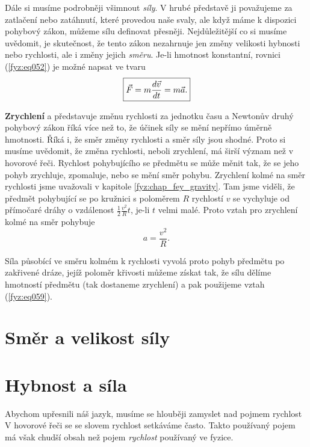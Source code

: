     Dále si musíme podrobněji všimnout \emph{síly}. V hrubé představě ji považujeme za zatlačení 
    nebo zatáhnutí, které provedou naše svaly, ale když máme k dispozici pohybový zákon, můžeme 
    sílu definovat přesněji. Nejdůležitější co si musíme uvědomit, je skutečnost, že tento zákon 
    nezahrnuje jen změny velikosti hybnosti nebo rychlosti, ale i změny jejich \emph{směru}. Je-li 
    hmotnost konstantní, rovnici (\ref{fyz:eq052}) je možné napsat ve tvaru
    \begin{equation}\label{fyz:eq053}
      \boxed{
        \vec{F} = m\dfrac{d \vec{v}}{d t} = m\vec{a}.
       }
    \end{equation}
    
    \textbf{Zrychlení} a představuje změnu rychlosti za jednotku času a Newtonův druhý pohybový 
    zákon říká více než to, že účinek síly se mění nepřímo úměrně hmotnosti. Říká i, že směr změny 
    rychlosti a směr síly jsou shodné. Proto si musíme uvědomit, že změna rychlosti, neboli 
    zrychlení, má širší význam než v hovorové řeči. Rychlost pohybujícího se předmětu se může měnit 
    tak, že se jeho pohyb zrychluje, zpomaluje, nebo se mění směr pohybu. Zrychlení kolmé na směr 
    rychlosti jsme uvažovali v kapitole \ref{fyz:chap_fey_gravity}. Tam jsme viděli, že předmět 
    pohybující se po kružnici s poloměrem \(R\) rychlostí \(v\) se vychyluje od přímočaré dráhy o 
    vzdálenost \(\frac{1}{2}\frac{v^2}{R}t\), je-li \(t\) velmi malé. Proto vztah pro zrychlení 
    kolmé na směr pohybuje
    \begin{equation}\label{fyz:eq059}
      a = \frac{v^2}{R}.
    \end{equation}
    
    Síla působící ve směru kolmém k rychlosti vyvolá proto pohyb předmětu po zakřivené dráze, jejíž 
    poloměr křivosti můžeme získat tak, že sílu dělíme hmotností předmětu (tak dostaneme zrychlení) 
    a pak použijeme vztah (\ref{fyz:eq059}).
    
  \section{Směr a velikost síly}\label{fyz:IchapIXsecI}
  \section{Hybnost a síla}\label{fyz:IchapIXsecII}
    Abychom upřesnili náš jazyk, musíme se hlouběji zamyslet nad pojmem rychlost V hovorové řeči se 
    se slovem rychlost setkáváme často. Takto používaný pojem má však chudší obsah než pojem 
    \emph{rychlost} používaný ve fyzice.

